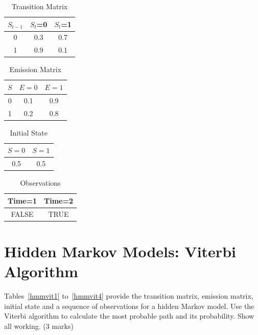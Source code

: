 \documentclass{article}
\begin{document}
\begin{table}[h!]
\caption{Transition Matrix}
\label{hmmfb1}
\begin{center}
\begin{tabular}{ |c||c|c| } 
\hline
 $S_{t-1}$ & $S_t$=0 & $S_t$=1\\
\hline
 0 & 0.3 & 0.7\\
 1 & 0.9 & 0.1\\
\hline
\end{tabular}
\end{center}
\end{table}
\begin{table}[h!]
\caption{Emission Matrix}
\label{hmmfb2}
\begin{center}
\begin{tabular}{ |c||c|c| } 
\hline
 $S$ & $E=0$ & $E=1$\\
\hline
 0 & 0.1 & 0.9\\
 1 & 0.2 & 0.8\\
\hline
\end{tabular}
\end{center}
\end{table}
\begin{table}[h!]
\caption{Initial State}
\label{hmmfb3}
\begin{center}
\begin{tabular}{ |c|c| } 
\hline
 $S=0$ & $S=1$\\
\hline
0.5 & 0.5\\
\hline
\end{tabular}
\end{center}
\end{table}
\begin{table}[h!]
\caption{Observations}
\label{hmmfb4}
\begin{center}
\begin{tabular}{ |c|c| } 
\hline
 Time=1 & Time=2\\
\hline
FALSE & TRUE\\
\hline
\end{tabular}
\end{center}
\end{table}
\clearpage
\section{Hidden Markov Models: Viterbi Algorithm}

Tables~\ref{hmmvit1} to~\ref{hmmvit4} provide the transition matrix, emission matrix, initial state and a sequence of observations for a hidden Markov model. Use the Viterbi algorithm to calculate the most probable path and its probability. Show all working. (3 marks)
\end{document}
